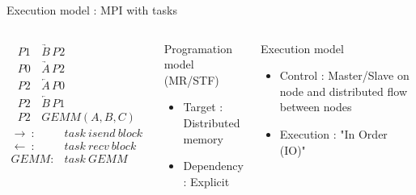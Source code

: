 \documentclass[tikz,presentation,border=10pt]{beamer}
\begin{document}
\begin{frame}[t]{Execution model : MPI with tasks}
\begin{columns}
        \begin{columns}
            \begin{equation*}
                \begin{aligned}
                    P1 \,  & \underrightarrow{B} \, P2 \\
                    P0 \,& \underrightarrow{A} \,P2 \\
                    P2 \,& \underleftarrow{A}  \,P0  \\
                    P2 \,& \underleftarrow{B}  \,P1 \\
                    P2 \,& GEMM(A,B,C)
                \end{aligned}
            \end{equation*}
            \begin{align*}
                \rightarrow\ : & task\ isend\ block \\
                \leftarrow\ :  & task\ recv\ block \\
                GEMM : & task\ GEMM
            \end{align*}
        \end{columns}

        \begin{block}{Programation model (MR/STF)}
            \begin{itemize}
                \item Target : Distributed memory
                \item Dependency : Explicit
            \end{itemize}
        \end{block}
        \begin{exampleblock}{Execution model}
            \begin{itemize}
                \item Control : Master/Slave on node and distributed flow between nodes
                \item Execution : "In Order (IO)"
            \end{itemize}
        \end{exampleblock}
    \end{columns}
\end{frame}
\end{document}
